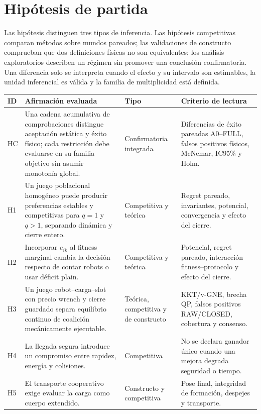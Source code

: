 \section{Hipótesis de partida}

Las hipótesis distinguen tres tipos de inferencia. Las hipótesis competitivas comparan métodos sobre mundos pareados; las validaciones de constructo comprueban que dos definiciones físicas no son equivalentes; los análisis exploratorios describen un régimen sin promover una conclusión confirmatoria. Una diferencia solo se interpreta cuando el efecto y su intervalo son estimables, la unidad inferencial es válida y la familia de multiplicidad está definida.

\begin{table}[H]
\centering
\scriptsize
\begin{tabularx}{\textwidth}{@{}p{}p{}p{}X@{}}
\toprule
ID & Afirmación evaluada & Tipo & Criterio de lectura \\
\midrule
HC & Una cadena acumulativa de comprobaciones distingue aceptación estática y éxito físico; cada restricción debe evaluarse en su familia objetivo sin asumir monotonía global. & Confirmatoria integrada & Diferencias de éxito pareadas A0--FULL, falsos positivos físicos, McNemar, IC95\% y Holm. \\
H1 & Un juego poblacional homogéneo puede producir preferencias estables y competitivas para $q=1$ y $q>1$, separando dinámica y cierre entero. & Competitiva y teórica & Regret pareado, invariantes, potencial, convergencia y efecto del cierre. \\
H2 & Incorporar $e_{ik}$ al fitness marginal cambia la decisión respecto de contar robots o usar déficit plain. & Competitiva y teórica & Potencial, regret pareado, interacción fitness--protocolo y efecto del cierre. \\
H3 & Un juego robot--carga--slot con precio wrench y cierre guardado separa equilibrio continuo de coalición mecánicamente ejecutable. & Teórica, competitiva y de constructo & KKT/v-GNE, brecha QP, falsos positivos RAW/CLOSED, cobertura y consenso. \\
H4 & La llegada segura introduce un compromiso entre rapidez, energía y colisiones. & Competitiva & No se declara ganador único cuando una mejora degrada seguridad o tiempo. \\
H5 & El transporte cooperativo exige evaluar la carga como cuerpo extendido. & Constructo y competitiva & Pose final, integridad de formación, despejes y transporte. \\

\end{tabularx}
\end{table}

